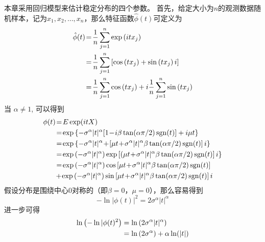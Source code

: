 本章采用回归模型来估计稳定分布的四个参数。
首先，给定大小为$n$的观测数据随机样本，记为$x_1, x_2, \ldots, x_n$，那么特征函数$\hat{\phi}(t)$可定义为
\begin{align}
	\hat{\phi}(t)&\!=\!\frac{1}{n} \sum_{j=1}^{n} \exp \left(i t x_{j}\right) \notag \\
	&\!=\!\frac{1}{n} \sum_{j=1}^{n}\left[\cos \left(t x_{j}\right)+\sin \left(t x_{j}\right) i\right] \notag \\
	&\!=\!\frac{1}{n} \sum_{j=1}^{n} \cos \left(t x_{j}\right)+i \frac{1}{n} \sum_{j=1}^{n} \sin \left(t x_{j}\right)
\end{align}
当 $\alpha \neq 1$, 可以得到
\begin{align}
	\phi(t) 
	&\!=\!E \exp (i t X) \notag \\ 
	&\!=\!\exp \left\{-\sigma^{\alpha}|t|^{\alpha}[1\!-\!i \beta \tan (\alpha \pi / 2) \operatorname{sgn}(t)]+i \mu t\right\} \notag \\ 
	&\!=\!\exp \left\{-\sigma^{\alpha}|t|^{\alpha}\!+\!\left[\mu t\!+\!\sigma^{\alpha}|t|^{\alpha} \beta \tan (\alpha \pi / 2) \operatorname{sgn}(t)\right] i\right\} \notag \\  
	&\!=\!\exp \left(-\sigma^{\alpha}|t|^{\alpha}\right) \exp \left[\left(\mu t\!+\!\sigma^{\alpha}|t|^{\alpha} \beta \tan (\alpha \pi / 2) \operatorname{sgn}(t)\right] i\right\} \notag \\ 
	&\!=\!\exp \left(-\sigma^{\alpha}|t|^{\alpha}\right) \cos \left[\mu t\!+\!\sigma^{\alpha}|t|^{\alpha} \beta \tan (\alpha \pi / 2) \operatorname{sgn}(t)\right] \notag \\ 
	&\!+\!\exp \left(-\sigma^{\alpha}|t|^{\alpha}\right) \sin \left[\mu t\!+\!\sigma^{\alpha}|t|^{\alpha} \beta \tan (\alpha \pi / 2) \operatorname{sgn}(t)\right] i 
\label{equ 5-5}
\end{align}
假设分布是围绕中心$0$对称的（即$\beta = 0$，$\mu = 0$），那么容易得到
\begin{equation}
	-\ln |\phi(t)|^{2}=2 \sigma^{\alpha}|t|^{\alpha}
\end{equation}
进一步可得
\begin{align} 
	\ln \left(-\ln | \phi(t)^{2}\right)
	&= \ln \left(2 \sigma^{\alpha}|t|^{\alpha}\right) \notag \\ 
	&=\ln \left(2 \sigma^{\alpha}\right)+\alpha \ln (|t|) 
\end{align}


